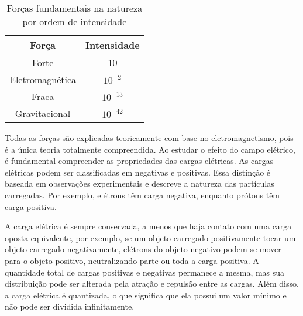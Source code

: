 \begin{table}[h]
\centering
\caption{Forças fundamentais na natureza por ordem de intensidade}
\label{tab:forcasnatureza}
\begin{tabular}{|c|c|}
\hline
\textbf{Força}  & \textbf{Intensidade}    \\ \hline
Forte           & 10                      \\ \hline
Eletromagnética & $10^{-2}$  \\ \hline
Fraca           & $10^{-13}$\\ \hline
Gravitacional   & $10^{-42}$\\ \hline
\end{tabular}
\end{table}



Todas as forças são explicadas teoricamente com base no eletromagnetismo, pois é a única teoria totalmente compreendida. Ao estudar o efeito do campo elétrico, é fundamental compreender as propriedades das cargas elétricas. As cargas elétricas podem ser classificadas em negativas e positivas. Essa distinção é baseada em observações experimentais e descreve a natureza das partículas carregadas. Por exemplo, elétrons têm carga negativa, enquanto prótons têm carga positiva.
    
A carga elétrica é sempre conservada, a menos que haja contato com uma carga oposta equivalente, por exemplo, se um objeto carregado positivamente tocar um objeto carregado negativamente, elétrons do objeto negativo podem se mover para o objeto positivo, neutralizando parte ou toda a carga positiva.  A quantidade total de cargas positivas e negativas permanece a mesma, mas sua distribuição pode ser alterada pela atração e repulsão entre as cargas. Além disso, a carga elétrica é quantizada, o que significa que ela possui um valor mínimo e não pode ser dividida infinitamente.
